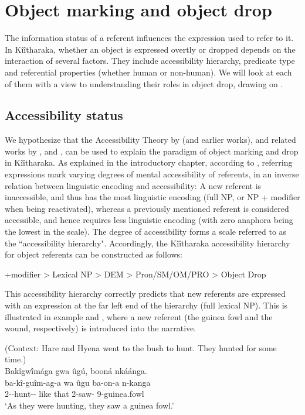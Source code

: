 \documentclass[output=paper]{langscibook}
\begin{document}
\section{Object marking and object drop}
\label{bkm:Ref115790593}
The information status of a referent influences the expression used to refer to it. In Kîîtharaka, whether an object is expressed overtly or dropped depends on the interaction of several factors. They include accessibility hierarchy, predicate type and referential properties (whether human or non-human). We will look at each of them with a view to understanding their roles in object drop, drawing on \citet{Kanampiu2023}.

\subsection{Accessibility status}

We hypothesize that the Accessibility Theory by \citet{Ariel2001} (and earlier works), and related works by \citet{Chafe1976,Chafe1987}, \citet{GundelEtAl1993} and \citet{Givón1984a}, can be used to explain the paradigm of object marking and drop in Kîîtharaka. As explained in the introductory chapter, according to \citet{Ariel2001}, referring expressions mark varying degrees of mental accessibility of referents, in an inverse relation between linguistic encoding and accessibility: A new referent is inaccessible, and thus has the most linguistic encoding (full NP, or NP + modifier when being reactivated), whereas a previously mentioned referent is considered accessible, and hence requires less linguistic encoding (with zero anaphora being the lowest in the scale). The degree of accessibility forms a scale referred to as the ``accessibility hierarchy". Accordingly, the Kîîtharaka accessibility hierarchy for object referents can be constructed as follows:

+{modifier}  > {Lexical NP} > {DEM} > {Pron/SM/OM/PRO} > {Object Drop}
 \z

This accessibility hierarchy correctly predicts that new referents are expressed with an expression at the far left end of the hierarchy (full lexical NP). This is illustrated in example  and , where a new referent (the guinea fowl and the wound, respectively) is introduced into the narrative.

\ea
\label{bkm:Ref120115686}
(Context: Hare and Hyena went to the bush to hunt. They hunted for some time.)\\
Bakîgw\'{î}mága gwa ûgú, booná nkáánga.\\
\gll
ba-kî-guîm-ag-a  wa  ûgu  ba-on-a  n-kanga\\
2\SM-\DEP{}-hunt-\HAB-\FV{} like  that 2\SM{}-saw-\FV{} 9-guinea.fowl\\
\glt
‘As they were hunting, they saw a guinea fowl.’
\end{document}
